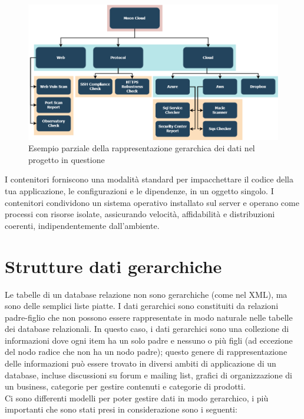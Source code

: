 \begin{figure}[ht!]
	\centering
	\includegraphics[scale=0.49]{images/MC_Rec_NTM.png}
	\caption{Esempio parziale della rappresentazione gerarchica dei dati nel progetto in questione}
	\label{fig:Hde}
\end{figure}

I contenitori forniscono una modalità standard per impacchettare il codice della tua applicazione, le configurazioni e le dipendenze, 
in un oggetto singolo. I contenitori condividono un sistema operativo installato sul server e operano come processi con risorse isolate, 
assicurando velocità, affidabilità e distribuzioni coerenti, indipendentemente dall’ambiente.

\section{Strutture dati gerarchiche}
Le tabelle di un database relazione non sono gerarchiche (come nel XML), ma sono delle semplici liste piatte. I dati gerarchici sono 
constituiti da relazioni padre-figlio che non possono essere rappresentate in modo naturale nelle tabelle dei database relazionali.
In questo caso, i dati gerarchici sono una collezione di informazioni dove ogni item ha un solo padre e nessuno o più figli
(ad eccezione del nodo radice che non ha un nodo padre); questo genere di rappresentazione delle informazioni può essere trovato in 
diversi ambiti di applicazione di un database, incluse discussioni su forum e mailing list, grafici di organizzazione di un business, 
categorie per gestire contenuti e categorie di prodotti. \\


Ci sono differenti modelli per poter gestire dati in modo gerarchico, i più importanti che sono stati presi in considerazione sono i 
seguenti:

